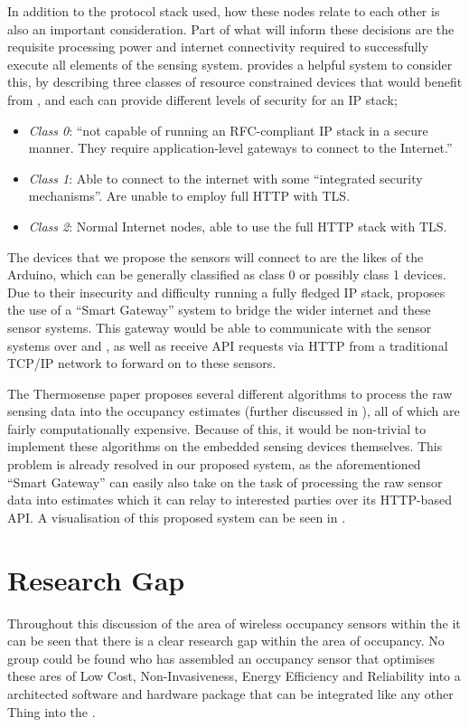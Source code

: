 \documentclass[../thesis/thesis.tex]{subfiles}
\begin{document}
In addition to the protocol stack used, how these nodes relate to each other is also an important consideration. Part of what will inform these decisions are the requisite processing power and internet connectivity required to successfully execute all elements of the sensing system. \cite{kovatsch2013coap} provides a helpful system to consider this, by describing three classes of resource constrained devices that would benefit from \coap, and each can provide different levels of security for an IP stack;

\begin{itemize}
 \item \emph{Class 0}: ``not capable of running an RFC-compliant IP stack in a secure manner. They require application-level gateways to connect to the Internet.''
 \item \emph{Class 1}: Able to connect to the internet with some ``integrated security mechanisms''. Are unable to employ full HTTP with TLS.
 \item \emph{Class 2}: Normal Internet nodes, able to use the full HTTP stack with TLS.
\end{itemize}

The devices that we propose the sensors will connect to are the likes of the Arduino, which can be generally classified as class 0 or possibly class 1 devices. Due to their insecurity and difficulty running a fully fledged IP stack, \cite{guinard2011internet} proposes the use of a ``Smart Gateway'' system to bridge the wider internet and these sensor systems. This gateway would be able to communicate with the sensor systems over \coap and \lwifi, as well as receive API requests via HTTP from a traditional TCP/IP network to forward on to these sensors.

The Thermosense paper \cite{beltran2013thermosense} proposes several different algorithms to process the raw sensing data into the occupancy estimates (further discussed in ), all of which are fairly computationally expensive. Because of this, it would be non-trivial to implement these algorithms on the embedded sensing devices themselves. This problem is already resolved in our proposed system, as the aforementioned ``Smart Gateway'' can easily also take on the task of processing the raw sensor data into estimates which it can relay to interested parties over its HTTP-based API. A visualisation of this proposed system can be seen in .

\section{Research Gap}
\label{sec:litreview:researchgap}
Throughout this discussion of the area of wireless occupancy sensors within the \iot it can be seen that there is a clear research gap within the area of occupancy. No group could be found who has assembled an occupancy sensor that optimises these ares of Low Cost, Non-Invasiveness, Energy Efficiency and Reliability into a architected software and hardware package that can be integrated like any other Thing into the \iot.
\end{document}
